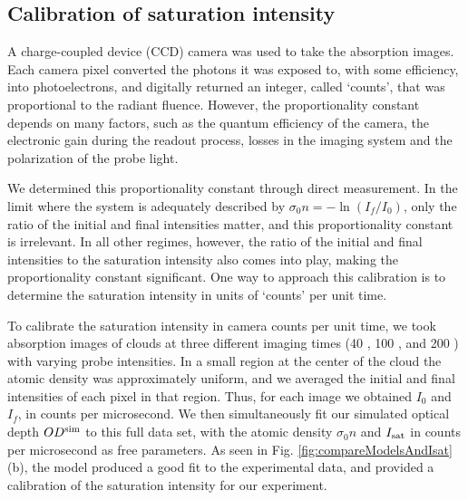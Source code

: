 \documentclass[12pt]{iopart}
\begin{document}
\subsection{Calibration of saturation intensity}
A charge-coupled device (CCD) camera was used to take the absorption images.  Each camera pixel  converted the photons it was exposed to, with some efficiency, into photoelectrons, and digitally returned an integer, called `counts', that was proportional to the radiant fluence.  However, the proportionality constant depends on many factors, such as the quantum efficiency of the camera, the electronic gain during the readout process, losses in the imaging system and the polarization of the probe light.
\par We determined this proportionality constant through direct measurement. In the limit where the system is adequately described by $\sigma_0 n=-\ln(I_f/I_0)$, only the ratio of the initial and final intensities matter, and this proportionality constant is irrelevant. In all other regimes, however, the ratio of the initial and final intensities to the saturation intensity also comes into play, making the proportionality constant significant. One way to approach this calibration is to determine the saturation intensity in units of `counts' per unit time.
\par To calibrate the saturation intensity in camera counts per unit time, we took absorption images of \K{} clouds at three different imaging times (40 \us{}, 100 \us{}, and 200 \us{}) with varying probe intensities. In a small region at the center of the cloud the atomic density was approximately uniform, and we averaged the initial and final intensities of each pixel in that region. Thus, for each image we obtained $I_0$ and $I_f$, in counts per microsecond. We then simultaneously fit our simulated optical depth  $OD^{\rm{sim}}$ to this full data set, with the atomic density $\sigma_0 n$ and  $I_{\rm{sat}}$ in counts per microsecond as free parameters. As seen in Fig. \ref{fig:compareModelsAndIsat}(b), the model produced a good fit to the experimental data, and provided a calibration of the saturation intensity for our experiment.
\end{document}
